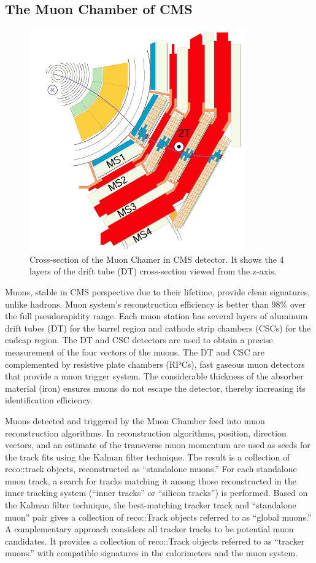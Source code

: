 \subsection{The Muon Chamber of CMS}
\begin{figure}[h!]
  \label{fig:MC}
  \centering
  \includegraphics[width=0.4\linewidth]{figs/MCcms.png}
	\caption{Cross-section of the Muon Chamer in CMS detector. It shows the 4 layers of the drift tube (DT) cross-section viewed from the z-axis. \cite{det}}
\end{figure}

Muons, stable in CMS perspective due to their lifetime, provide clean signatures, unlike hadrons.
Muon system's reconstruction efficiency is better than 98\% over the full pseudorapidity range.
Each muon station has several layers of aluminum drift tubes (DT) for the barrel region and cathode strip chambers (CSCs) for the endcap region.
The DT and CSC detectors are used to obtain a precise measurement of the four vectors of the muons.
The DT and CSC are complemented by resistive plate chambers (RPCs), fast gaseous muon detectors that provide a muon trigger system.
The considerable thickness of the absorber material (iron) ensures muons do not escape the detector, thereby increasing its identification efficiency.

Muons detected and triggered by the Muon Chamber feed into muon reconstruction algorithms.
In reconstruction algorithms, position, direction vectors, and an estimate of the transverse muon momentum are used as seeds for the track fits using the Kalman filter technique.
The result is a collection of reco::track objects, reconstructed as ``standalone muons.''
For each standalone muon track, a search for tracks matching it among those reconstructed in the inner tracking system (``inner tracks'' or ``silicon tracks'')  is performed.
Based on the Kalman filter technique, the best-matching tracker track and ``standalone muon'' pair gives a collection of reco::Track objects referred to as ``global muons.''
A complementary approach considers all tracker tracks to be potential muon candidates. 
It provides a collection of reco::Track objects referred to as ``tracker muons.''  with compatible signatures in the calorimeters and the muon system.

